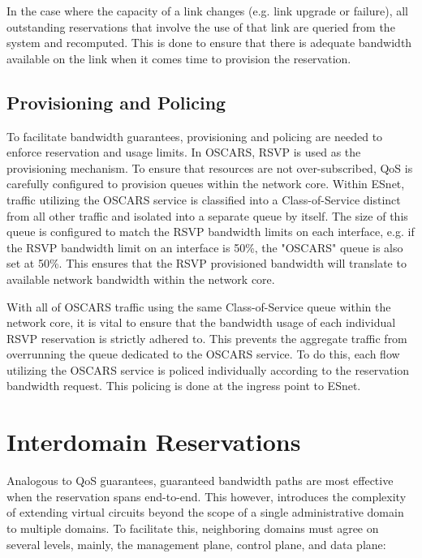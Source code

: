 \documentclass[conference]{IEEEtran}
\begin{document}
In the case where the capacity of a link changes (e.g. link upgrade or failure), all outstanding reservations
that involve the use of that link are queried from the system and recomputed.
This is done to ensure that there is adequate bandwidth available on the link when it comes time to provision the reservation.

\subsection{Provisioning and Policing}
To facilitate bandwidth guarantees, provisioning and policing are needed to 
enforce reservation and usage limits.  In OSCARS, RSVP is used as the 
provisioning mechanism.  To ensure that resources are not over-subscribed, QoS 
is carefully configured to provision queues within the network core.  Within 
ESnet, traffic utilizing the OSCARS service is classified into a 
Class-of-Service distinct from all other traffic and isolated into a separate 
queue by 
itself.  The size of this queue is configured to match the RSVP bandwidth 
limits on each interface, e.g. if the RSVP bandwidth limit on an interface is 
50\%, the "OSCARS" queue is also set at 50\%.  This ensures that the RSVP 
provisioned bandwidth will translate to available network bandwidth within 
the network core.

With all of OSCARS traffic using the same Class-of-Service queue within the 
network core, it is vital to ensure that the bandwidth usage of each individual 
RSVP reservation is strictly adhered to.  This prevents the aggregate traffic 
from overrunning the queue dedicated to the OSCARS service.  To do this, each 
flow utilizing the OSCARS service is policed individually according to the 
reservation bandwidth request.  This policing is done at the ingress point to 
ESnet.


\section{Interdomain Reservations}

Analogous to QoS guarantees, guaranteed bandwidth paths are most effective 
when the reservation spans end-to-end.  This however, introduces the 
complexity of extending virtual circuits beyond the scope of a 
single administrative domain to multiple domains.  To facilitate this, 
neighboring domains must agree on several levels, mainly, the management plane, 
control plane, and data plane:
\end{document}
